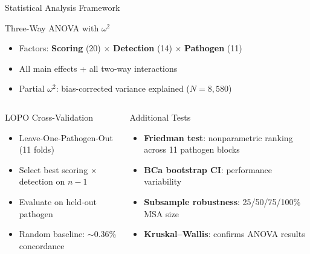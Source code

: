 \begin{frame}{Statistical Analysis Framework}
  \begin{block}{Three-Way ANOVA with $\omega^2$}
    \begin{itemize}
      \item Factors: \textbf{Scoring} (20) $\times$ \textbf{Detection} (14) $\times$ \textbf{Pathogen} (11)
      \item All main effects + all two-way interactions
      \item Partial $\omega^2$: bias-corrected variance explained ($N = 8{,}580$)
    \end{itemize}
  \end{block}

  \begin{columns}[T]
    \begin{block}{LOPO Cross-Validation}
      \begin{itemize}
        \item Leave-One-Pathogen-Out (11 folds)
        \item Select best scoring $\times$ detection on $n{-}1$
        \item Evaluate on held-out pathogen
        \item Random baseline: $\sim$0.36\% concordance
      \end{itemize}
    \end{block}

    \begin{block}{Additional Tests}
      \begin{itemize}
        \item \textbf{Friedman test}: nonparametric ranking across 11 pathogen blocks
        \item \textbf{BCa bootstrap CI}: performance variability
        \item \textbf{Subsample robustness}: 25/50/75/100\% MSA size
        \item \textbf{Kruskal--Wallis}: confirms ANOVA results
      \end{itemize}
    \end{block}
  \end{columns}
\end{frame}

